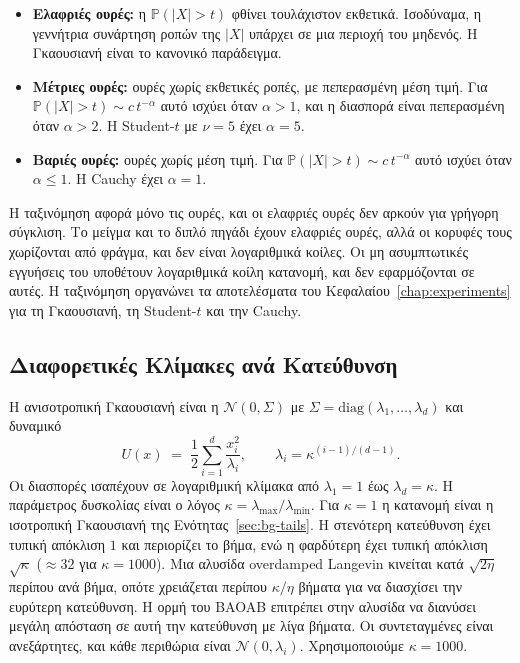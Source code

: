 \begin{itemize}
  \item \textbf{Ελαφριές ουρές:} η $\mathbb{P}(|X|>t)$ φθίνει τουλάχιστον
        εκθετικά. Ισοδύναμα, η γεννήτρια συνάρτηση ροπών της $|X|$ υπάρχει σε μια περιοχή του μηδενός.
        Η Γκαουσιανή είναι το κανονικό παράδειγμα.
  \item \textbf{Μέτριες ουρές:} ουρές χωρίς εκθετικές ροπές, με πεπερασμένη μέση τιμή.
        Για $\mathbb{P}(|X|>t) \sim c\, t^{-\alpha}$ αυτό ισχύει όταν $\alpha > 1$, και η
        διασπορά είναι πεπερασμένη όταν $\alpha > 2$. Η Student-$t$ με $\nu = 5$ έχει
        $\alpha = 5$.
  \item \textbf{Βαριές ουρές:} ουρές χωρίς μέση τιμή. Για
        $\mathbb{P}(|X|>t) \sim c\, t^{-\alpha}$ αυτό ισχύει όταν $\alpha \le 1$. Η Cauchy
        έχει $\alpha = 1$.
\end{itemize}

Η ταξινόμηση αφορά μόνο τις ουρές, και οι ελαφριές ουρές δεν αρκούν για γρήγορη
σύγκλιση. Το μείγμα και το διπλό πηγάδι έχουν ελαφριές ουρές, αλλά οι κορυφές τους
χωρίζονται από φράγμα, και δεν είναι λογαριθμικά κοίλες. Οι μη ασυμπτωτικές εγγυήσεις
του \citet{dalalyan2017theoretical} υποθέτουν λογαριθμικά κοίλη κατανομή, και δεν
εφαρμόζονται σε αυτές. Η ταξινόμηση οργανώνει τα αποτελέσματα του
Κεφαλαίου~\ref{chap:experiments} για τη Γκαουσιανή, τη Student-$t$ και την Cauchy.

\subsection{Διαφορετικές Κλίμακες ανά Κατεύθυνση}
\label{sec:bg-anisotropic}

Η ανισοτροπική Γκαουσιανή είναι η $\mathcal{N}(0, \Sigma)$ με
$\Sigma = \mathrm{diag}(\lambda_1, \ldots, \lambda_d)$ και δυναμικό
\begin{equation}
  U(x) \;=\; \frac12 \sum_{i=1}^{d} \frac{x_i^2}{\lambda_i},
  \qquad \lambda_i = \kappa^{(i-1)/(d-1)}.
\end{equation}
Οι διασπορές ισαπέχουν σε λογαριθμική κλίμακα από $\lambda_1 = 1$ έως
$\lambda_d = \kappa$. Η παράμετρος δυσκολίας είναι ο λόγος
$\kappa = \lambda_{\max}/\lambda_{\min}$. Για $\kappa = 1$ η κατανομή είναι η
ισοτροπική Γκαουσιανή της Ενότητας~\ref{sec:bg-tails}. Η στενότερη κατεύθυνση
έχει τυπική απόκλιση $1$ και περιορίζει το βήμα, ενώ η φαρδύτερη έχει τυπική
απόκλιση $\sqrt{\kappa}$ ($\approx 32$ για $\kappa = 1000$). Μια αλυσίδα
overdamped Langevin κινείται κατά $\sqrt{2\eta}$ περίπου ανά βήμα, οπότε
χρειάζεται περίπου $\kappa/\eta$ βήματα για να διασχίσει την ευρύτερη
κατεύθυνση. Η ορμή του BAOAB επιτρέπει στην αλυσίδα να διανύσει μεγάλη απόσταση
σε αυτή την κατεύθυνση με λίγα βήματα. Οι συντεταγμένες είναι ανεξάρτητες, και
κάθε περιθώρια είναι $\mathcal{N}(0, \lambda_i)$. Χρησιμοποιούμε $\kappa = 1000$.

